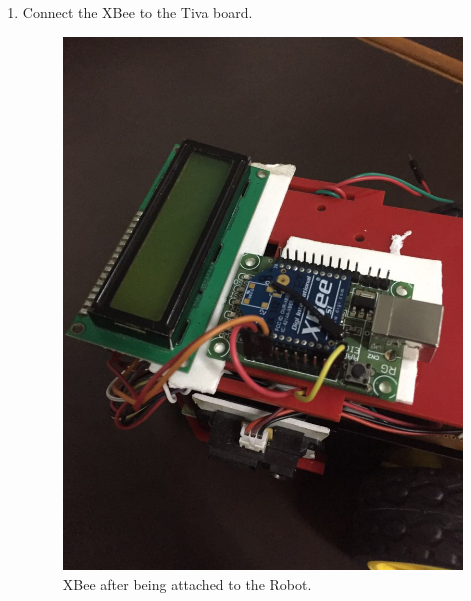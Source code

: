 \documentclass[a4paper,12pt,oneside]{book}
\begin{document}
\begin{enumerate}
\item Connect the XBee to the Tiva board.
\begin{figure}[h]
        \centering
        \includegraphics[scale=0.16]{XBee_a}
        \caption{XBee after being attached to the Robot.}
      \end{figure}
      \newpage


\end{enumerate}
\end{document}
